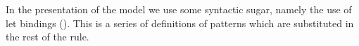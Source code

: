In the presentation of the model we use some syntactic
sugar, namely
the use of let bindings (). This is a series of
definitions of patterns which are substituted in the rest of the rule. \\

%


